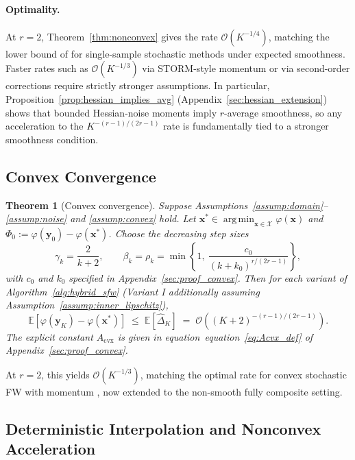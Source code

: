 \documentclass{article}
\def\eqref#1{equation~\ref{#1}}
\newcommand{\cX}{\mathcal{X}}
\def\vx{{\bm{x}}}
\def\vy{{\bm{y}}}
\newcommand{\E}{\mathbb{E}}
\DeclareMathOperator*{\argmin}{arg\,min}
\newtheorem{theorem}{Theorem}
\begin{document}
\paragraph{Optimality.}
At $r = 2$, Theorem~\ref{thm:nonconvex} gives the rate $\mathcal{O}(K^{-1/4})$, matching the lower bound of \citet{arjevani2023lower} for single-sample stochastic methods under expected smoothness. Faster rates such as $\mathcal{O}(K^{-1/3})$ via STORM-style momentum \citep{cutkosky2019momentum} or via second-order corrections \citep{hassani2020stochastic} require strictly stronger assumptions. In particular, Proposition~\ref{prop:hessian_implies_avg} (Appendix~\ref{sec:hessian_extension}) shows that bounded Hessian-noise moments imply $r$-average smoothness, so any acceleration to the $K^{-(r-1)/(2r-1)}$ rate is fundamentally tied to a stronger smoothness condition.

\subsection{Convex Convergence}

\begin{theorem}[Convex convergence] \label{thm:convex}
Suppose Assumptions~\ref{assump:domain}--\ref{assump:noise} and \ref{assump:convex} hold. Let $\vx^* \in \argmin_{\vx \in \cX} \varphi(\vx)$ and $\Phi_0 := \varphi(\vy_0) - \varphi(\vx^*)$. Choose the decreasing step sizes
\begin{equation}\label{eq:convex_schedule}
\gamma_k = \frac{2}{k+2}, \qquad \beta_k = \rho_k = \min\!\left\{1,\ \frac{c_0}{(k+k_0)^{r/(2r-1)}}\right\},
\end{equation}
with $c_0$ and $k_0$ specified in Appendix~\ref{sec:proof_convex}. Then for each variant of Algorithm~\ref{alg:hybrid_sfw} (Variant I additionally assuming Assumption~\ref{assump:inner_lipschitz}),
\[
\E[\varphi(\vy_K) - \varphi(\vx^*)] \;\le\; \E[\hat\Delta_K] \;=\; \mathcal{O}\!\left((K+2)^{-(r-1)/(2r-1)}\right).
\]
The explicit constant $A_{\mathrm{cvx}}$ is given in equation~\eqref{eq:Acvx_def} of Appendix~\ref{sec:proof_convex}.
\end{theorem}

At $r = 2$, this yields $\mathcal{O}(K^{-1/3})$, matching the optimal rate for convex stochastic FW with momentum \citep{mokhtari2020stochastic}, now extended to the non-smooth fully composite setting.

\subsection{Deterministic Interpolation and Nonconvex Acceleration}
\end{document}
